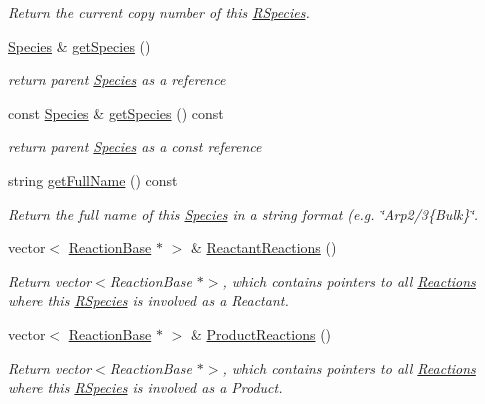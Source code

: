 \begin{DoxyCompactItemize}
\begin{DoxyCompactList}\small\item\em Return the current copy number of this \hyperlink{classRSpecies}{R\+Species}. \end{DoxyCompactList}\item 
\hyperlink{classSpecies}{Species} \& \hyperlink{classRSpecies_acd2575ae0c35ed2eddddd346baffd103}{get\+Species} ()
\begin{DoxyCompactList}\small\item\em return parent \hyperlink{classSpecies}{Species} as a reference \end{DoxyCompactList}\item 
const \hyperlink{classSpecies}{Species} \& \hyperlink{classRSpecies_a4a68b63a45665131b5640389932274b1}{get\+Species} () const 
\begin{DoxyCompactList}\small\item\em return parent \hyperlink{classSpecies}{Species} as a const reference \end{DoxyCompactList}\item 
string \hyperlink{classRSpecies_ae7f6d21c784b823a9929db2871948692}{get\+Full\+Name} () const 
\begin{DoxyCompactList}\small\item\em Return the full name of this \hyperlink{classSpecies}{Species} in a string format (e.\+g. \char`\"{}\+Arp2/3\{\+Bulk\}\char`\"{}. \end{DoxyCompactList}\item 
vector$<$ \hyperlink{classReactionBase}{Reaction\+Base} $\ast$ $>$ \& \hyperlink{classRSpecies_a51a3f15e8b4ae12c6b1b706ff615c804}{Reactant\+Reactions} ()
\begin{DoxyCompactList}\small\item\em Return vector$<$\+Reaction\+Base $\ast$$>$, which contains pointers to all \hyperlink{classReaction}{Reactions} where this \hyperlink{classRSpecies}{R\+Species} is involved as a Reactant. \end{DoxyCompactList}\item 
vector$<$ \hyperlink{classReactionBase}{Reaction\+Base} $\ast$ $>$ \& \hyperlink{classRSpecies_aa48b1fba86bebd7824076a86a65a7b76}{Product\+Reactions} ()
\begin{DoxyCompactList}\small\item\em Return vector$<$\+Reaction\+Base $\ast$$>$, which contains pointers to all \hyperlink{classReaction}{Reactions} where this \hyperlink{classRSpecies}{R\+Species} is involved as a Product. \end{DoxyCompactList}\item 

\end{DoxyCompactItemize}

